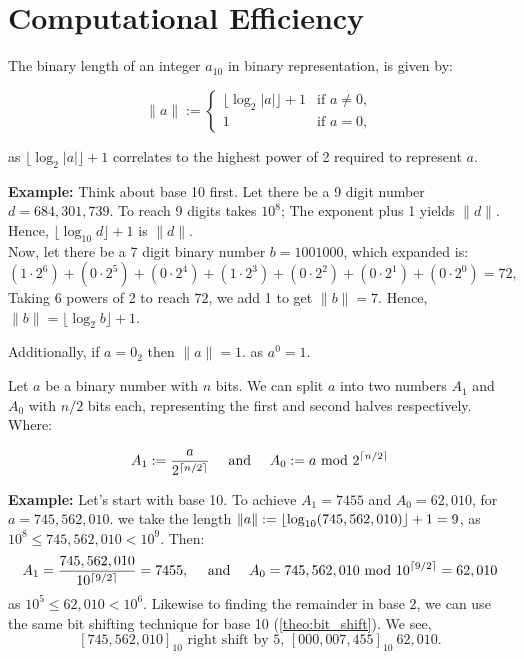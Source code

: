 \section{Computational Efficiency}

\begin{theo}
    
    The binary length of an integer $a_{10}$ in binary representation, is given by:
    
    \[
    \|a\| := 
    \begin{cases} 
    \lfloor \log_2 |a| \rfloor + 1 & \text{if } a \neq 0, \\
    1 & \text{if } a = 0,
    \end{cases}
    \]
    
    \noindent
    as $\lfloor \log_2 |a| \rfloor + 1$ correlates to the highest power of 2 required to represent $a$.
\end{theo}

\noindent
\textbf{Example:} Think about base 10 first. Let there be a 9 digit number $d=684,301,739$.
To reach 9 digits takes $10^8$; The exponent plus 1 yields $\|d\|$. Hence, $\lfloor \log_{10} d\rfloor+1$ is $\|d\|$.\\

\noindent
Now, let there be a 7 digit binary number $b=1001000$, which expanded is:
$$ (1\cdot 2^6) + (0\cdot 2^5) + (0\cdot 2^4) + (1\cdot 2^3) + (0\cdot 2^2) + (0\cdot 2^1) + (0\cdot 2^0) = 72,$$
\noindent
Taking $6$ powers of 2 to reach $72$, we add 1 to get $\|b\| = 7$. Hence, $\|b\| = \lfloor \log_2 b \rfloor + 1$.

\noindent
Additionally, if $a=0_2$ then $\|a\|=1$. as $a^0=1$.\\

\noindent

\begin{theo}

    Let $a$ be a binary number with $n$ bits. We can split $a$ into two numbers $A_1$ and $A_0$ with $n/2$ bits each,
    representing the first and second halves respectively. Where:
    
        $$A_1:=\frac{a}{2^{\lceil n/2\rceil}} \quad \text{ and } \quad A_0:=a \text{ mod } 2^{\lceil n/2\rceil}$$

\end{theo}

\noindent
\textbf{Example:} Let's start with base 10. To achieve $A_1=7455$ and $A_0=62,010$, for $a=745,562,010$.
we take the length $\|a\|:=\lfloor\log_{10}(745,562,010)\rfloor+1=9$, as $10^8\leq 745,562,010<10^9$. Then:
\[ A_1=\frac{745,562,010}{10^{\lceil9/2\rceil}}=7455, \quad \text{ and } \quad A_0=745,562,010 \text{ mod } 10^{\lceil9/2\rceil}=62,010 \]
\noindent
as $10^5\leq 62,010<10^6$. Likewise to finding the remainder in base 2, we can use the same bit shifting technique for base 10 (\ref{theo:bit_shift}).
We see,
$$[745,562,010]_{10} \text{ right shift by 5, } [000,007,455]_{10}\ 62,010.$$ 

